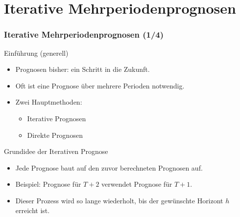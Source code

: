 \documentclass[10pt,aspectratio=169]{beamer}\usepackage[]{graphicx}\usepackage[]{xcolor}
\begin{document}
\section*{Iterative Mehrperiodenprognosen}



\begin{frame}
  \frametitle{Iterative Mehrperiodenprognosen \hfill (1/4)}

  Einführung (generell)
  
  \begin{itemize}
    \item Prognosen bisher: ein Schritt in die Zukunft.
    \item Oft ist eine Prognose über mehrere Perioden notwendig.
    \item Zwei Hauptmethoden:
    \begin{itemize}
      \item Iterative Prognosen
      \item Direkte Prognosen
    \end{itemize}
  \end{itemize}  

  Grundidee der Iterativen Prognose
  
  \begin{itemize}
    \item Jede Prognose baut auf den zuvor berechneten Prognosen auf.
    \item Beispiel: Prognose für $T+2$ verwendet Prognose für $T+1$.
    \item Dieser Prozess wird so lange wiederholt, bis der gewünschte Horizont $h$ erreicht ist.
  \end{itemize}  

\end{frame}
\end{document}
